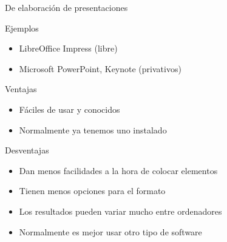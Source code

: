 \documentclass[xcolor=svgnames,compress]{beamer}
\begin{document}
\begin{frame}{De elaboración de presentaciones}

  \begin{block}{Ejemplos}
    \begin{itemize}
    \item LibreOffice Impress (libre)
    \item Microsoft PowerPoint, Keynote (privativos)
    \end{itemize}
  \end{block}

  \begin{block}{Ventajas}
    \begin{itemize}
    \item Fáciles de usar y conocidos
    \item Normalmente ya tenemos uno instalado
    \end{itemize}
  \end{block}

  \begin{block}{Desventajas}
    \begin{itemize}
    \item Dan menos facilidades a la hora de colocar elementos
    \item Tienen menos opciones para el formato
    \item Los resultados pueden variar mucho entre ordenadores
    \item Normalmente es mejor usar otro tipo de software
    \end{itemize}
  \end{block}

\end{frame}
\end{document}
